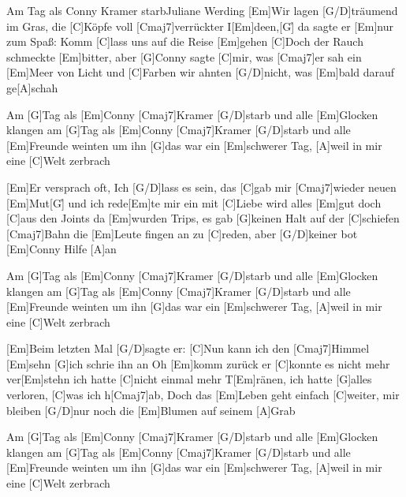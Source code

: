 \documentclass[../main.tex]{subfiles}
\begin{document}
\begin{song}[5]{Am Tag als Conny Kramer starb}{Juliane Werding}{}
[Em]Wir lagen [G/D]träumend im Gras, die [C]Köpfe voll [Cmaj7]verrückter I[Em]deen,[G]{\h}
da sagte er [Em]nur zum Spaß: Komm [C]lass uns auf die Reise [Em]gehen
[C]Doch der Rauch schmeckte [Em]bitter, aber [G]Conny sagte [C]mir, was [Cmaj7]er sah
ein [Em]Meer von Licht und [C]Farben wir ahnten [G/D]nicht, was [Em]bald darauf ge[A]schah

Am [G]Tag als [Em]Conny [Cmaj7]Kramer [G/D]starb und alle [Em]Glocken klangen
am [G]Tag als [Em]Conny [Cmaj7]Kramer [G/D]starb und alle [Em]Freunde weinten um ihn
[G]das war ein [Em]schwerer Tag, [A]weil in mir eine [C]Welt zerbrach

[Em]Er versprach oft, \glqq Ich [G/D]lass es sein\grqq, das [C]gab mir [Cmaj7]wieder neuen [Em]Mut[G]{\h}
und ich rede[Em]te mir ein mit [C]Liebe wird alles [Em]gut
doch [C]aus den Joints da [Em]wurden Trips,
es gab [G]keinen Halt auf der [C]schiefen [Cmaj7]Bahn
die [Em]Leute fingen an zu [C]reden, aber [G/D]keiner bot [Em]Conny Hilfe [A]an

Am [G]Tag als [Em]Conny [Cmaj7]Kramer [G/D]starb und alle [Em]Glocken klangen
am [G]Tag als [Em]Conny [Cmaj7]Kramer [G/D]starb und alle [Em]Freunde weinten um ihn
[G]das war ein [Em]schwerer Tag, [A]weil in mir eine [C]Welt zerbrach

[Em]Beim letzten Mal [G/D]sagte er: [C]Nun kann ich den [Cmaj7]Himmel [Em]sehn
[G]ich schrie ihn an \glqq Oh [Em]komm zurück\grqq{} er [C]konnte es nicht mehr ver[Em]stehn
ich hatte [C]nicht einmal mehr T[Em]ränen,
ich hatte [G]alles verloren, [C]was ich h[Cmaj7]ab,
Doch das [Em]Leben geht einfach [C]weiter,
mir bleiben [G/D]nur noch die [Em]Blumen auf seinem [A]Grab

Am [G]Tag als [Em]Conny [Cmaj7]Kramer [G/D]starb und alle [Em]Glocken klangen
am [G]Tag als [Em]Conny [Cmaj7]Kramer [G/D]starb und alle [Em]Freunde weinten um ihn
[G]das war ein [Em]schwerer Tag, [A]weil in mir eine [C]Welt zerbrach

\end{song}
\end{document}
